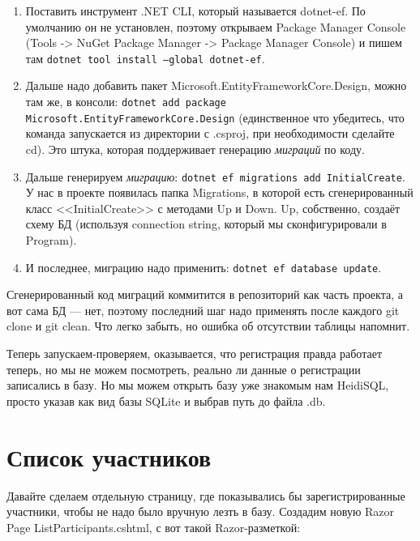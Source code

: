 \documentclass[a5paper]{article}
\begin{document}
\begin{enumerate}
    \item Поставить инструмент .NET CLI, который называется dotnet-ef. По умолчанию он не установлен, поэтому открываем Package Manager Console (Tools -> NuGet Package Manager -> Package Manager Console) и пишем там \texttt{dotnet tool install --global dotnet-ef}.
    \item Дальше надо добавить пакет Microsoft.EntityFrameworkCore.Design, можно там же, в консоли: \texttt{dotnet add package Microsoft.EntityFrameworkCore.Design} (единственное что убедитесь, что команда запускается из директории с .csproj, при необходимости сделайте cd). Это штука, которая поддерживает генерацию \emph{миграций} по коду.
    \item Дальше генерируем \emph{миграцию}: \texttt{dotnet ef migrations add InitialCreate}. У нас в проекте появилась папка Migrations, в которой есть сгенерированный класс <<InitialCreate>> с методами Up и Down. Up, собственно, создаёт схему БД (используя connection string, который мы сконфигурировали в Program).
    \item И последнее, миграцию надо применить: \texttt{dotnet ef database update}.
\end{enumerate}

Сгенерированный код миграций коммитится в репозиторий как часть проекта, а вот сама БД --- нет, поэтому последний шаг надо применять после каждого git clone и git clean. Что легко забыть, но ошибка об отсутствии таблицы напомнит.

Теперь запускаем-проверяем, оказывается, что регистрация правда работает теперь, но мы не можем посмотреть, реально ли данные о регистрации записались в базу. Но мы можем открыть базу уже знакомым нам HeidiSQL, просто указав как вид базы SQLite и выбрав путь до файла .db. 

\section{Список участников}

Давайте сделаем отдельную страницу, где показывались бы зарегистрированные участники, чтобы не надо было вручную лезть в базу. Создадим новую Razor Page ListParticipants.cshtml, с вот такой Razor-разметкой:
\end{document}
